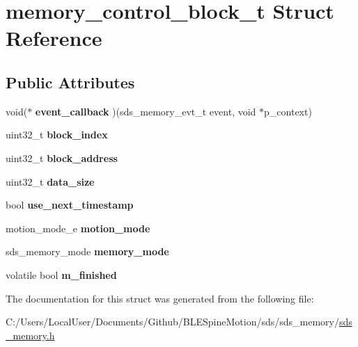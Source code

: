 \hypertarget{structmemory__control__block__t}{}\section{memory\+\_\+control\+\_\+block\+\_\+t Struct Reference}
\label{structmemory__control__block__t}
\subsection*{Public Attributes}
\begin{DoxyCompactItemize}
\item 
\mbox{\label{structmemory__control__block__t_aafaa3f50855f318bbdb3feb295356afd}} 
void($\ast$ {\bfseries event\+\_\+callback} )(sds\+\_\+memory\+\_\+evt\+\_\+t event, void $\ast$p\+\_\+context)
\item 
\mbox{\label{structmemory__control__block__t_a0e9a71bcd2bdaf235a7b52108fe2f04d}} 
uint32\+\_\+t {\bfseries block\+\_\+index}
\item 
\mbox{\label{structmemory__control__block__t_a92a2639bce2b87def30302200cb5732d}} 
uint32\+\_\+t {\bfseries block\+\_\+address}
\item 
\mbox{\label{structmemory__control__block__t_af590d7d8fdc4d25768e7029dc64e5f19}} 
uint32\+\_\+t {\bfseries data\+\_\+size}
\item 
\mbox{\label{structmemory__control__block__t_a4cffbe6798012338ff99fef8ea033e6d}} 
bool {\bfseries use\+\_\+next\+\_\+timestamp}
\item 
\mbox{\label{structmemory__control__block__t_a40ae6bdb370062d1787cac35d607bd10}} 
motion\+\_\+mode\+\_\+e {\bfseries motion\+\_\+mode}
\item 
\mbox{\label{structmemory__control__block__t_aa716ef068fb4374637f632e7e71199e6}} 
sds\+\_\+memory\+\_\+mode {\bfseries memory\+\_\+mode}
\item 
\mbox{\label{structmemory__control__block__t_a70693ac5161667404084b9533af543d7}} 
volatile bool {\bfseries m\+\_\+finished}
\end{DoxyCompactItemize}


The documentation for this struct was generated from the following file\+:\begin{DoxyCompactItemize}
\item 
C\+:/\+Users/\+Local\+User/\+Documents/\+Github/\+B\+L\+E\+Spine\+Motion/sds/sds\+\_\+memory/\mbox{\hyperlink{sds__memory_8h}{sds\+\_\+memory.\+h}}\end{DoxyCompactItemize}
